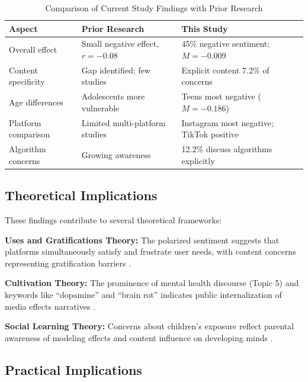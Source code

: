 \documentclass[12pt,a4paper]{article}
\begin{document}
\begin{table}[H]
\centering
\caption{Comparison of Current Study Findings with Prior Research}
\label{tab:comparison_findings}
\small
\begin{tabular}{L{3cm}L{5cm}L{5cm}}
\toprule
\textbf{Aspect} & \textbf{Prior Research} & \textbf{This Study} \\
\midrule
Overall effect & Small negative effect, $r = -0.08$ \citep{nguyen2025feeds} & 45\% negative sentiment; $M = -0.009$ \\
\addlinespace
Content specificity & Gap identified; few studies & Explicit content 7.2\% of concerns \\
\addlinespace
Age differences & Adolescents more vulnerable \citep{twenge2018increases} & Teens most negative ($M = -0.186$) \\
\addlinespace
Platform comparison & Limited multi-platform studies & Instagram most negative; TikTok positive \\
\addlinespace
Algorithm concerns & Growing awareness \citep{ribeiro2020auditing} & 12.2\% discuss algorithms explicitly \\
\bottomrule
\end{tabular}
\end{table}

\subsection{Theoretical Implications}

These findings contribute to several theoretical frameworks:

\textbf{Uses and Gratifications Theory:} The polarized sentiment suggests that platforms simultaneously satisfy and frustrate user needs, with content concerns representing gratification barriers \citep{katz1973uses}.

\textbf{Cultivation Theory:} The prominence of mental health discourse (Topic 5) and keywords like ``dopamine'' and ``brain rot'' indicates public internalization of media effects narratives \citep{gerbner1998cultivation}.

\textbf{Social Learning Theory:} Concerns about children's exposure reflect parental awareness of modeling effects and content influence on developing minds \citep{bandura1977social}.

\subsection{Practical Implications}
\end{document}
